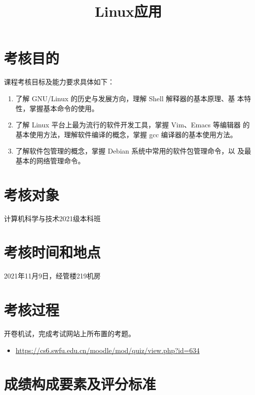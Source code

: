 \documentclass{swfuassessment}
\title{Linux应用}
\begin{document}
\headone{}

\section{考核目的}
课程考核目标及能力要求具体如下：

\begin{enumerate}
\item 了解 GNU/Linux 的历史与发展方向，理解 Shell 解释器的基本原理、基
  本特性，掌握基本命令的使用。
\item 了解 Linux 平台上最为流行的软件开发工具，掌握 Vim、Emacs 等编辑器
  的基本使用方法，理解软件编译的概念，掌握 gcc 编译器的基本使用方法。
\item 了解软件包管理的概念，掌握 Debian 系统中常用的软件包管理命令，以
  及最基本的网络管理命令。
\end{enumerate}

\section{考核对象}

计算机科学与技术2021级本科班

\section{考核时间和地点}

2021年11月9日，经管楼219机房

\section{考核过程}

开卷机试，完成考试网站上所布置的考题。

\begin{itemize}
\item \url{https://cs6.swfu.edu.cn/moodle/mod/quiz/view.php?id=634}
\end{itemize}

\section{成绩构成要素及评分标准}
\end{document}
